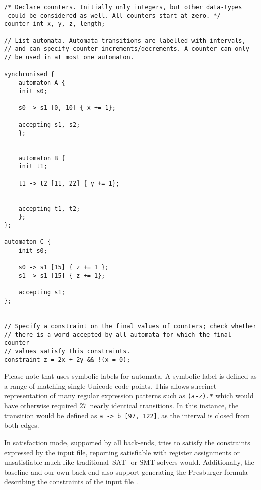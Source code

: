 \documentclass[acmsmall,review,anonymous]{acmart}\settopmatter{printfolios=true,printccs=false,printacmref=true}
\theoremstyle{definition}
\begin{document}
\begin{lstlisting}[caption={An example input file for \Catra{}, illustrating every major syntax element. From beginning to end: synchronised (product) automata using the keyword \texttt{synchronised} (automata A and B), range labels, and their single-character shorthand syntax, register increments, and constraints on the final values of their counters.}, label=lst:input-example]
  /* Declare counters. Initially only integers, but other data-types
 could be considered as well. All counters start at zero. */
counter int x, y, z, length;

// List automata. Automata transitions are labelled with intervals,
// and can specify counter increments/decrements. A counter can only
// be used in at most one automaton.

synchronised {
    automaton A {
    init s0;

    s0 -> s1 [0, 10] { x += 1};

    accepting s1, s2;
    };


    automaton B {
    init t1;

    t1 -> t2 [11, 22] { y += 1};


    accepting t1, t2;
    };
};

automaton C {
    init s0;

    s0 -> s1 [15] { z += 1 };
    s1 -> s1 [15] { z += 1};

    accepting s1;
};


// Specify a constraint on the final values of counters; check whether
// there is a word accepted by all automata for which the final counter
// values satisfy this constraints.
constraint z = 2x + 2y && !(x = 0);
\end{lstlisting}

Please note that \Catra{} uses symbolic labels for automata. A symbolic label is
defined as a range of matching single Unicode code points. This allows succinct
representation of many regular expression patterns such as \lstinline{(a-z).*}
which would have otherwise required $27$~nearly identical transitions. In this
instance, the transition would be defined as \lstinline{a -> b [97, 122]}, as the
interval is closed from both edges.

In satisfaction mode, supported by all back-ends, \Catra{} tries to satisfy the
constraints expressed by the input file, reporting satisfiable with register
assignments or unsatisfiable much like traditional~SAT- or SMT solvers would.
Additionally, the baseline and our own back-end also support generating
the Presburger formula describing the constraints of the input file .
\end{document}

